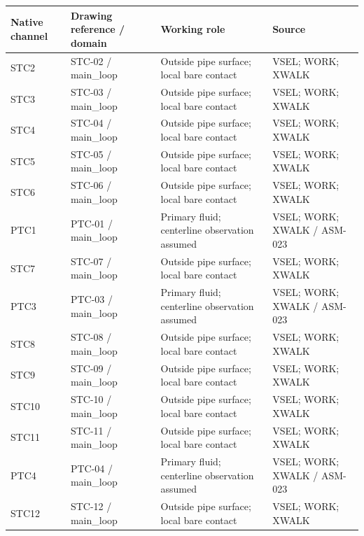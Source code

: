 \documentclass[11pt]{article}
\begin{document}
\begingroup\small\setlength{\tabcolsep}{4pt}
\begin{longtable}{>{\raggedright\arraybackslash}p{}>{\raggedright\arraybackslash}p{}>{\raggedright\arraybackslash}p{}>{\raggedright\arraybackslash}p{}}
\toprule
\textbf{Native channel} & \textbf{Drawing reference / domain} & \textbf{Working role} & \textbf{Source}\\\midrule\endhead
STC2 & STC-02 / main\_\allowbreak{}loop & Outside pipe surface; local bare contact & VSEL; WORK; XWALK\\[4pt]
STC3 & STC-03 / main\_\allowbreak{}loop & Outside pipe surface; local bare contact & VSEL; WORK; XWALK\\[4pt]
STC4 & STC-04 / main\_\allowbreak{}loop & Outside pipe surface; local bare contact & VSEL; WORK; XWALK\\[4pt]
STC5 & STC-05 / main\_\allowbreak{}loop & Outside pipe surface; local bare contact & VSEL; WORK; XWALK\\[4pt]
STC6 & STC-06 / main\_\allowbreak{}loop & Outside pipe surface; local bare contact & VSEL; WORK; XWALK\\[4pt]
PTC1 & PTC-01 / main\_\allowbreak{}loop & Primary fluid; centerline observation assumed & VSEL; WORK; XWALK / ASM-023\\[4pt]
STC7 & STC-07 / main\_\allowbreak{}loop & Outside pipe surface; local bare contact & VSEL; WORK; XWALK\\[4pt]
PTC3 & PTC-03 / main\_\allowbreak{}loop & Primary fluid; centerline observation assumed & VSEL; WORK; XWALK / ASM-023\\[4pt]
STC8 & STC-08 / main\_\allowbreak{}loop & Outside pipe surface; local bare contact & VSEL; WORK; XWALK\\[4pt]
STC9 & STC-09 / main\_\allowbreak{}loop & Outside pipe surface; local bare contact & VSEL; WORK; XWALK\\[4pt]
STC10 & STC-10 / main\_\allowbreak{}loop & Outside pipe surface; local bare contact & VSEL; WORK; XWALK\\[4pt]
STC11 & STC-11 / main\_\allowbreak{}loop & Outside pipe surface; local bare contact & VSEL; WORK; XWALK\\[4pt]
PTC4 & PTC-04 / main\_\allowbreak{}loop & Primary fluid; centerline observation assumed & VSEL; WORK; XWALK / ASM-023\\[4pt]
STC12 & STC-12 / main\_\allowbreak{}loop & Outside pipe surface; local bare contact & VSEL; WORK; XWALK\\[4pt]

\end{longtable}
\end{document}
